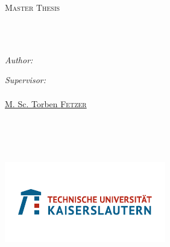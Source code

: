 \documentclass[
11pt, %
english, %
singlespacing, %
headsepline, %
]{MastersDoctoralThesis} %
\author{Jingyuan  \textsc{Sha}} %
\begin{document}
\frontmatter %

\pagestyle{plain} %


\begin{titlepage}
\begin{center}
\vspace*{.06\textheight}
{\scshape\LARGE \univname\par}\vspace{1.5cm} %
\textsc{\Large Master Thesis}\\[0.5cm] %

\HRule \\[0.4cm] %
{\huge \bfseries \ttitle\par}\vspace{0.4cm} %
\HRule \\[1.5cm] %
 
\begin{minipage}[t]{0.4\textwidth}
\begin{flushleft} \large
\emph{Author:}\\
\href{https://linkedin.com/in/jingyuan-sha-5b8b43208}{\authorname} %
\end{flushleft}
\end{minipage}
\begin{minipage}[t]{0.4\textwidth}
\begin{flushright} \large
\emph{Supervisor:} \\
\href{https://av.dfki.de/members/stricker/}{\supname}\\
\href{https://av.dfki.de/members/fetzer/}{M. Sc. Torben \textsc{Fetzer}}
\end{flushright}
\end{minipage}\\[3cm]
 
\vfill


\groupname\\\deptname\\ %
\includegraphics{Figures/TUK_LOGO_RGB}\\[2cm] %
 

\end{center}
\end{titlepage}
\end{document}
